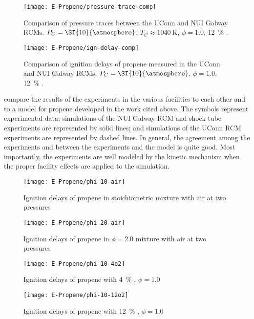 \documentclass[../main.tex]{subfiles}
\begin{document}
\begin{figure}
    \begin{floatrow}
        \ffigbox
            {\texttt{[image: E-Propene/pressure-trace-comp]}}
            {\caption{Comparison of pressure traces between the UConn and
            NUI Galway RCMs. $P_C=\SI{10}{\atmosphere}$, $T_C\approx\SI{1040}{\kelvin}$,
            $\phi=1.0$, \SI{12}{\percent} .}
            \label{fig:pressure-trace-comp}}
        \ffigbox
            {\texttt{[image: E-Propene/ign-delay-comp]}}
            {\caption{Comparison of ignition delays of propene measured
            in the UConn and NUI Galway RCMs. $P_C=\SI{10}{\atmosphere}$,
            $\phi=1.0$, \SI{12}{\percent} .}
            \label{fig:ign-delay-comp}}
    \end{floatrow}
\end{figure}

 compare the results of the experiments in the
various facilities to each other and to a model for propene developed
in the work cited above. The symbols represent experimental data; simulations
of the NUI Galway RCM and shock tube experiments are represented by solid lines;
and simulations of the UConn RCM experiments are represented by dashed lines.
In general, the agreement among the experiments and between the experiments
and the model is quite good. Most importantly, the experiments are well
modeled by the kinetic mechanism when the proper facility effects are
applied to the simulation.

\begin{figure}
    \begin{floatrow}
        \ffigbox
            {\texttt{[image: E-Propene/phi-10-air]}}
            {\caption[Ignition delays of propene in stoichiometric
            mixture with air at\newline two pressures]{Ignition delays of propene in stoichiometric
            mixture with air at two pressures}
            \label{fig:phi-10-air}}
        \ffigbox
            {\texttt{[image: E-Propene/phi-20-air]}}
            {\caption{Ignition delays of propene in $\phi=2.0$
            mixture with air at two pressures}
            \label{fig:phi-20-air}}
    \end{floatrow}
\end{figure}

\begin{figure}
    \begin{floatrow}
        \ffigbox
            {\texttt{[image: E-Propene/phi-10-4o2]}}
            {\caption{Ignition delays of propene with \SI{4}{\percent}
            , $\phi=1.0$}
            \label{fig:phi-10-4o2}}
        \ffigbox
            {\texttt{[image: E-Propene/phi-10-12o2]}}
            {\caption{Ignition delays of propene with \SI{12}{\percent}
            , $\phi=1.0$}
            \label{fig:phi-10-12o2}}
    \end{floatrow}
\end{figure}
\end{document}
